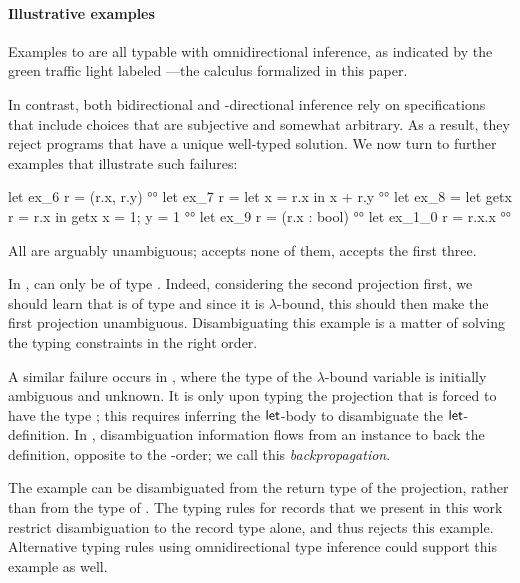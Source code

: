 \documentclass[acmsmall,screen,nonacm,review]{acmart}
\begin{document}
\paragraph{Illustrative examples}

Examples  to  are all typable with omnidirectional
inference, as indicated by the green traffic light labeled \OML---the
calculus formalized in this paper.

%
In contrast, both bidirectional and \Geninst-directional inference
rely on specifications that include choices that are subjective
and somewhat arbitrary. As a result, they reject programs
that have a unique well-typed solution. We now turn to
further examples that illustrate such failures:
%
\locallabelreset
%
\begin{program}[input]
let ex_6 r = (r.x, r.y)                          	°°
let ex_7 r = let x = r.x in x + r.y              	°°
let ex_8 = let getx r = r.x in getx {x = 1; y = 1}      °°
let ex_9 r = (r.x : bool)                        	°°
let ex_1_0 r = r.x.x                              	°°
\end{program}
All are arguably unambiguous; \OCaml accepts none of them, \OML accepts the first three.

In ,  can only be of type . Indeed,
considering the second projection first, we should learn that
 is of type  and since it is $\lambda$-bound, this
should then make the first projection unambiguous. Disambiguating this example is a matter
of solving the typing constraints in the right order.

A similar failure occurs in , where the type of the
$\lambda$-bound variable  is initially ambiguous and
unknown. It is only upon typing the projection  that
 is forced to have the type ; this requires
inferring the $\mathopen{}\mathrel{\mathsf{let}}$-body to disambiguate the $\mathopen{}\mathrel{\mathsf{let}}$-definition.
%
In , disambiguation information flows from an instance to
back the definition, opposite to the \Geninst-order; we call this
\emph{backpropagation}.

The example  can be disambiguated from the return type of
the projection, rather than from the type of . The typing rules for
records that we present in this work restrict disambiguation to the
record type alone, and thus rejects this example. Alternative typing rules
using omnidirectional type inference could support this example as
well.
\end{document}
